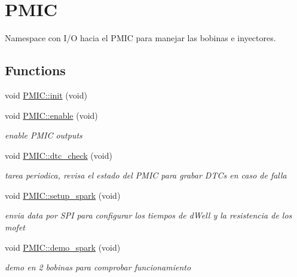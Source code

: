 \hypertarget{group__PMIC}{}\section{P\+M\+IC}
\label{group__PMIC}


Namespace con I/O hacia el P\+M\+IC para manejar las bobinas e inyectores.  


\subsection*{Functions}
\begin{DoxyCompactItemize}
\item 
void \hyperlink{group__PMIC_gaf878c10ae8fe4de3f17a586947e72f58}{P\+M\+I\+C\+::init} (void)
\item 
\mbox{\label{group__PMIC_ga4498377453ee62a5937ae511844c080f}} 
void \hyperlink{group__PMIC_ga4498377453ee62a5937ae511844c080f}{P\+M\+I\+C\+::enable} (void)
\begin{DoxyCompactList}\small\item\em enable P\+M\+IC outputs \end{DoxyCompactList}\item 
\mbox{\label{group__PMIC_ga9313d7e29fb1f4060dca04dccec44d64}} 
void \hyperlink{group__PMIC_ga9313d7e29fb1f4060dca04dccec44d64}{P\+M\+I\+C\+::dtc\+\_\+check} (void)
\begin{DoxyCompactList}\small\item\em tarea periodica, revisa el estado del P\+M\+IC para grabar D\+TC\textquotesingle{}s en caso de falla \end{DoxyCompactList}\item 
\mbox{\label{group__PMIC_ga95bc8cae06ee57254b0eb5286a26b004}} 
void \hyperlink{group__PMIC_ga95bc8cae06ee57254b0eb5286a26b004}{P\+M\+I\+C\+::setup\+\_\+spark} (void)
\begin{DoxyCompactList}\small\item\em envia data por S\+PI para configurar los tiempos de d\+Well y la resistencia de los mofet \end{DoxyCompactList}\item 
\mbox{\label{group__PMIC_gacc0f9db44748918cddd0d13301ec0dd9}} 
void \hyperlink{group__PMIC_gacc0f9db44748918cddd0d13301ec0dd9}{P\+M\+I\+C\+::demo\+\_\+spark} (void)
\begin{DoxyCompactList}\small\item\em demo en 2 bobinas para comprobar funcionamiento \end{DoxyCompactList}\end{DoxyCompactItemize}


